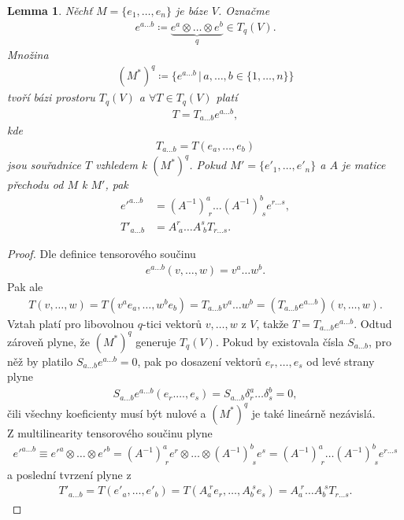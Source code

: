 \documentclass[a4paper,11pt]{article}
\theoremstyle{theorem}
\newtheorem{lemma}[theorem]{Lemma}
\theoremstyle{remark}
\theoremstyle{definition}
\begin{document}
	\begin{lemma}
		Něchť $M = \{e_1, \dots, e_n\}$ je báze $V$. Označme
		\begin{align*}
			e^{a \dots b} \coloneqq \underbrace{e^a \otimes \dots \otimes e^b}_{q} \in T_q(V).
		\end{align*}
		Množina
		\begin{align*}
			(M^*)^q \coloneqq \{ e^{a \dots b} \, | \, a, \dots, b \in \{1, \dots, n\} \}
		\end{align*}
		tvoří bázi prostoru $T_q(V)$ a $\forall T \in T_q(V)$ platí
		\begin{align*}
			T = T_{a \dots b} e^{a \dots b},
		\end{align*}
		kde
		\begin{align*}
			T_{a \dots b} = T(e_a, \dots, e_b)
		\end{align*}
		jsou souřadnice $T$ vzhledem k $(M^*)^q$. Pokud $M' = \{e'_1, \dots, e'_n\}$ a $A$ je matice přechodu od $M$ k $M'$, pak
		\begin{align*}
			e'^{a \dots b} &= (A^{-1})^a_{\; r} \dots (A^{-1})^b_{\; s} e^{r \dots s},
			\\
			T'_{a \dots b} &= A^r_{\; a} \dots A^s_{\; b} T_{r \dots s}.
		\end{align*}
	\end{lemma}
	\begin{proof}
		Dle definice tensorového součinu
		\begin{align*}
			e^{a \dots b}(v, \dots, w) = v^a \dots w^b.
		\end{align*}
		Pak ale
		\begin{align*}
			T(v, \dots, w) = T(v^a e_a, \dots, w^b e_b) = T_{a \dots b} v^a \dots w^b = (T_{a \dots b} e^{a \dots b})(v, \dots, w).
		\end{align*}
		Vztah platí pro libovolnou $q$-tici vektorů $v, \dots, w$ z $V$, takže $T = T_{a \dots b} e^{a \dots b}$. Odtud zároveň plyne, že $(M^*)^q$ generuje $T_q(V)$. Pokud by existovala čísla $S_{a \dots b}$, pro něž by platilo $S_{a \dots b} e^{a \dots b} = 0$, pak po dosazení vektorů $e_r, \dots, e_s$ od levé strany plyne
		\begin{align*}
			S_{a \dots b} e^{a \dots b}(e_r. \dots, e_s) = S_{a \dots b} \delta^a_r \dots \delta^b_s = 0,
		\end{align*}
		čili všechny koeficienty musí být nulové a $(M^*)^q$ je také lineárně nezávislá.\\
		Z multilinearity tensorového součinu plyne
		\begin{align*}
			e'^{a \dots b} \equiv e'^a \otimes \dots \otimes e'^b = (A^{-1})^a_{\; r} e^r \otimes \dots \otimes (A^{-1})^b_{\; s} e^s = (A^{-1})^a_{\; r} \dots (A^{-1})^b_{\; s} e^{r \dots s}
		\end{align*}
		a poslední tvrzení plyne z
		\begin{align*}
			T'_{a \dots b} = T(e'_a, \dots, e'_b) = T(A_a^{\; r} e_r, \dots, A_b^{\; s} e_s) = A_a^{\; r} \dots A_b^{\; s} T_{r \dots s}.
		\end{align*}
	\end{proof}
	
\end{document}
